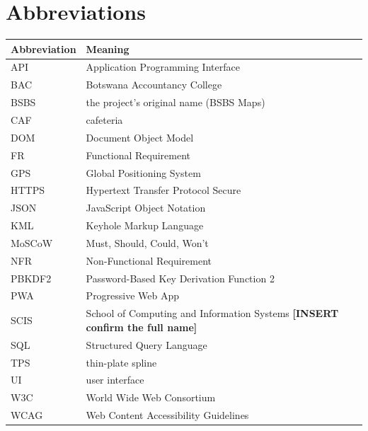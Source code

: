 \documentclass[12pt,a4paper]{report}
\newcommand{\tablespacing}{\singlespacing\small}
\newcommand{\placeholder}[1]{\textbf{[INSERT #1]}}
\begin{document}
\chapter{Abbreviations}\label{app:abbr}
{\tablespacing
\begin{longtable}{p{2.6cm}p{11cm}}
\toprule
Abbreviation & Meaning \\
\midrule\endhead
API & Application Programming Interface \\
BAC & Botswana Accountancy College \\
BSBS & the project's original name (BSBS Maps) \\
CAF & cafeteria \\
DOM & Document Object Model \\
FR & Functional Requirement \\
GPS & Global Positioning System \\
HTTPS & Hypertext Transfer Protocol Secure \\
JSON & JavaScript Object Notation \\
KML & Keyhole Markup Language \\
MoSCoW & Must, Should, Could, Won't \\
NFR & Non-Functional Requirement \\
PBKDF2 & Password-Based Key Derivation Function 2 \\
PWA & Progressive Web App \\
SCIS & School of Computing and Information Systems \placeholder{confirm the full name} \\
SQL & Structured Query Language \\
TPS & thin-plate spline \\
UI & user interface \\
W3C & World Wide Web Consortium \\
WCAG & Web Content Accessibility Guidelines \\
\bottomrule
\end{longtable}}
\end{document}
